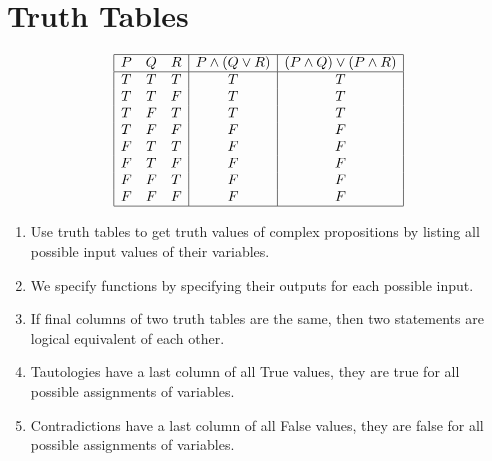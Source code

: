 \documentclass[11pt]{article}
\begin{document}
\section*{Truth Tables}
\begin{displaymath}
\begin{array}{|ccc|c|c|}
\hline
P & Q & R & P \wedge (Q \vee R) & (P \wedge Q) \vee (P \wedge R)\\ %
\hline %
T & T & T & T & T\\
T & T & F & T & T\\
T & F & T & T & T\\
T & F & F & F & F \\
F & T & T & F & F \\
F & T & F & F  & F\\
F & F & T & F &  F\\
F & F & F & F & F\\
\hline
\end{array}
\end{displaymath}
\begin{enumerate}
\item Use truth tables to get truth values of complex propositions by listing all possible input values of their variables.
\item We specify functions by specifying their outputs for each possible input.
\item If final columns of two truth tables are the same, then two statements are logical equivalent of each other.
\item Tautologies have a last column of all True values, they are true for all possible assignments of variables.
\item  Contradictions have a last column of all False values, they are false for all possible assignments of variables.
\end{enumerate}
\end{document}
